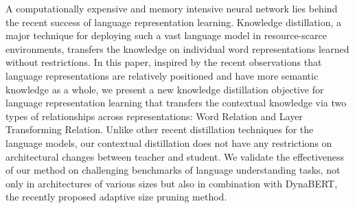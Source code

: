 A computationally expensive and memory intensive neural network lies behind the recent success of language representation learning. Knowledge distillation, a major technique for deploying such a vast language model in resource-scarce environments, transfers the knowledge on individual word representations learned without restrictions. In this paper, inspired by the recent observations that language representations are relatively positioned and have more semantic knowledge as a whole, we present a new knowledge distillation objective for language representation learning that transfers the contextual knowledge via two types of relationships across representations: Word Relation and Layer Transforming Relation. Unlike other recent distillation techniques for the language models, our contextual distillation does not have any restrictions on architectural changes between teacher and student. We validate the effectiveness of our method on challenging benchmarks of language understanding tasks, not only in architectures of various sizes but also in combination with DynaBERT, the recently proposed adaptive size pruning method.
